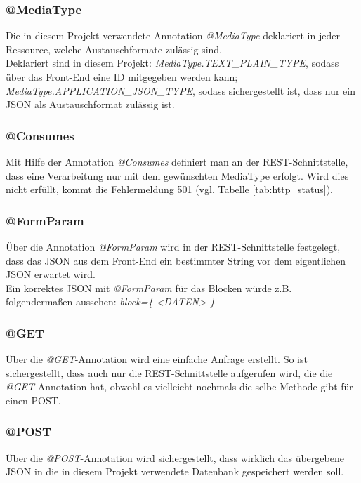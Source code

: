 \subsubsection*{@MediaType}
\label{sss:mediatype}
Die in diesem Projekt verwendete Annotation \textit{@MediaType} deklariert in jeder Ressource, welche Austauschformate zulässig sind. \\
Deklariert sind in diesem Projekt: \textit{MediaType.TEXT\_PLAIN\_TYPE}, sodass über das Front-End eine ID mitgegeben werden kann; \textit{MediaType.APPLICATION\_JSON\_TYPE}, sodass sichergestellt ist, dass nur ein \acs{JSON} als Austauschformat zulässig ist.

\subsubsection*{@Consumes}
\label{sss:consumes}
Mit Hilfe der Annotation \textit{@Consumes} definiert man an der \acs{REST}-Schnittstelle, dass eine Verarbeitung nur mit dem gewünschten MediaType erfolgt. Wird dies nicht erfüllt, kommt die Fehlermeldung 501 (vgl. Tabelle \vref{tab:http_status}). 

\subsubsection*{@FormParam}
\label{sss:formparam}
Über die Annotation \textit{@FormParam} wird in der \acs{REST}-Schnittstelle festgelegt, dass das \acs{JSON} aus dem Front-End ein bestimmter String vor dem eigentlichen \acs{JSON} erwartet wird. \\
Ein korrektes \acs{JSON} mit \textit{@FormParam} für das Blocken würde z.B. folgendermaßen aussehen: \textit{block=\{ <DATEN> \}}
\subsubsection*{@GET}
\label{sss:get}
Über die \textit{@GET}-Annotation wird eine einfache Anfrage erstellt. So ist sichergestellt, dass auch nur die \acs{REST}-Schnittstelle aufgerufen wird, die die \textit{@GET}-Annotation hat, obwohl es vielleicht nochmals die selbe Methode gibt für einen POST. 

\subsubsection*{@POST}
\label{sss:post}
Über die \textit{@POST}-Annotation wird sichergestellt, dass wirklich das übergebene \acs{JSON} in die in diesem Projekt verwendete Datenbank gespeichert werden soll. 

